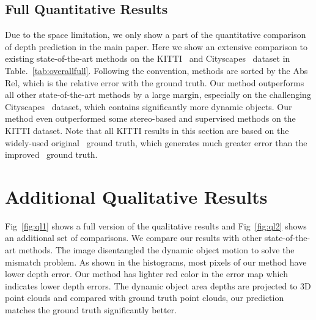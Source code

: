\documentclass[runningheads]{llncs}
\begin{document}
\begin{center}
\subsection{Full Quantitative Results}
Due to the space limitation, we only show a part of the quantitative comparison of depth prediction in the main paper. Here we show an extensive comparison to existing state-of-the-art methods on the KITTI~\cite{kitti} and Cityscapes~\cite{Cityscapes} dataset in Table.~\ref{tab:overallfull}. Following the convention, methods are sorted by the Abs Rel, which is the relative error with the ground truth. Our method outperforms all other state-of-the-art methods by a large margin, especially on the challenging Cityscapes~\cite{Cityscapes} dataset, which contains significantly more dynamic objects. Our method even outperformed some stereo-based and supervised methods on the KITTI dataset. Note that all KITTI results in this section are based on the widely-used original~\cite{kitti} ground truth, which generates much greater error than the improved~\cite{kitti2017} ground truth.
\section{Additional Qualitative Results}
Fig~\ref{fig:ql1} shows a full version of the qualitative results and Fig~\ref{fig:ql2} shows an additional set of comparisons. We compare our results with other state-of-the-art methods. The  image disentangled the dynamic object motion to solve the mismatch problem. As shown in the histograms, most pixels of our method have lower depth error. Our method has lighter {\color{red}red} color in the error map which indicates lower depth errors. The dynamic object area depths are projected to 3D point clouds and compared with ground truth point clouds, our prediction matches the ground truth significantly better.



\begin{table*}[t]
  \centering
  
\end{table*}
\end{center}
\end{document}
